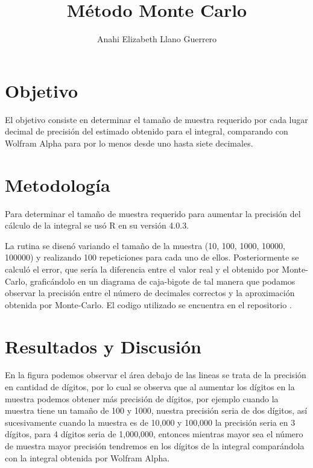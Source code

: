 \documentclass{article}
\begin{document}
\title{\textbf{M\'etodo Monte Carlo}}
\author{Anahi Elizabeth Llano Guerrero}

\maketitle

\section{Objetivo}\label{obj}

El objetivo \cite{elisa} consiste en determinar el tama\~no de muestra requerido por cada lugar decimal de precisi\'on del estimado obtenido para el integral, comparando con Wolfram Alpha para por lo menos desde uno hasta siete decimales.

\section{Metodolog\'{i}a}\label{met}

Para determinar el tama\~no de muestra requerido para aumentar la precisi\'on del c\'alculo de la integral se us\'o R en su versi\'on 4.0.3.


La rutina se disen\'o variando el tama\~no de la muestra (10, 100, 1000, 10000, 100000) y realizando 100 repeticiones para cada uno de ellos.  Posteriormente se calcul\'o el error, que ser\'ia la diferencia entre el valor real y el obtenido por Monte-Carlo, grafic\'andolo en un diagrama de caja-bigote de tal manera que podamos observar la precisi\'on entre el n\'umero de decimales correctos y la aproximaci\'on obtenida por Monte-Carlo. El codigo utilizado se encuentra en el repositorio \citet{ana}.

\section{Resultados y Discusi\'{o}n}\label{res}

En la figura podemos observar el \'area debajo de las lineas se trata de la precisi\'on en cantidad de d\'igitos, por lo cual se observa que al aumentar los d\'igitos en la muestra podemos obtener m\'as precisi\'on de d\'igitos, por ejemplo cuando la muestra tiene un tama\~no de 100 y 1000, nuestra precisi\'on seria de dos d\'igitos, as\'i sucesivamente cuando la muestra es de 10,000 y 100,000 la precisi\'on seria en 3 d\'igitos, para 4 d\'igitos seria de 1,000,000, entonces mientras mayor sea el n\'umero de muestra mayor precisi\'on tendremos en los d\'igitos de la integral compar\'andola con la integral obtenida por Wolfram Alpha.
\end{document}
